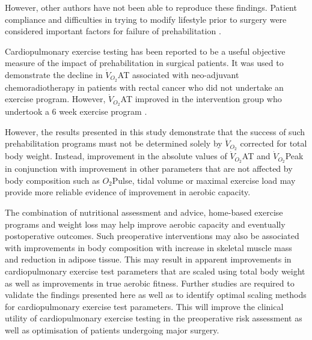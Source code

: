 However, other authors have not been able to reproduce these findings. 
Patient compliance and difficulties in trying to modify lifestyle prior to surgery were considered important factors for failure of prehabilitation \parencite{carli_randomized_2010, dronkers_preoperative_2010}.

Cardiopulmonary exercise testing has been reported to be a useful objective measure of the impact of prehabilitation in surgical patients. 
It was used to demonstrate the decline in $\dot{V}_{O_2}$AT associated with neo-adjuvant chemoradiotherapy in patients with rectal cancer who did not undertake an exercise program.
However, $\dot{V}_{O_2}$AT improved in the intervention group who undertook a 6 week exercise program \parencite{west_effect_2015}.

However, the results presented in this study demonstrate that the success of such prehabilitation programs must not be determined solely by $\dot{V}_{O_2}$ corrected for total body weight. 
Instead, improvement in the absolute values of $\dot{V}_{O_2}$AT and $\dot{V}_{O_2}$Peak in conjunction with improvement in other parameters that are not affected by body composition such as $O_2$Pulse, tidal volume \parencite{jones_effects_2007} or maximal exercise load \parencite{kim_responsive_2009} may provide more reliable evidence of improvement in aerobic capacity. 

The combination of nutritional assessment and advice, home-based exercise programs and weight loss may help improve aerobic capacity and eventually postoperative outcomes. 
Such preoperative interventions may also be associated with improvements in body composition with increase in skeletal muscle mass and reduction in adipose tissue.
This may result in apparent improvements in cardiopulmonary exercise test parameters that are scaled using total body weight as well as improvements in true aerobic fitness.
Further studies are required to validate the findings presented here as well as to identify optimal scaling methods for cardiopulmonary exercise test parameters. 
This will improve the clinical utility of cardiopulmonary exercise testing in the preoperative risk assessment as well as optimisation of patients undergoing major surgery.
